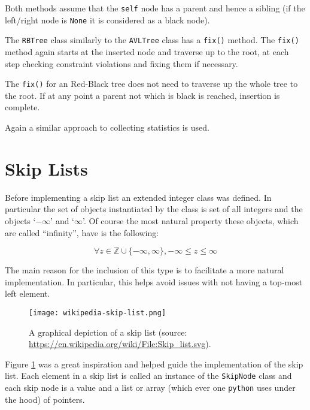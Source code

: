 \documentclass[article]{uom-coursework}
\begin{document}
\begin{note}
Both methods assume that the \texttt{self} node has a parent and
hence a sibling (if the left/right node is \texttt{None} it is
considered as a black node).
\end{note}

The \texttt{RBTree} class similarly to the \texttt{AVLTree}
class has a \texttt{fix()} method. The \texttt{fix()} method
again starts at the inserted node and traverse up to the root,
at each step checking constraint violations and fixing them
if necessary. 

\begin{note}
The \texttt{fix()} for an Red-Black tree does not need to
traverse up the whole tree to the root. If at any point a parent
not which is black is reached, insertion is complete.
\end{note}

Again a similar approach to collecting statistics is used.

\section{Skip Lists}

Before implementing a skip list an extended integer class was
defined. In particular the set of objects instantiated by the
class is set of all integers and the objects `$-\infty$' and
`$\infty$'. Of course the most natural property these objects,
which are called ``infinity'', have is the following:

$$\forall z \in \mathbb{Z} \cup \{-\infty, \infty\}, -\infty \leq z \leq \infty$$

The main reason for the inclusion of this type is to facilitate
a more natural implementation. In particular, this helps avoid
issues with not having a top-most left element.

\begin{figure}[H]
\centering
\texttt{[image: wikipedia-skip-list.png]}
\caption{A graphical depiction of a skip list (source: \url{https://en.wikipedia.org/wiki/File:Skip_list.svg}).}
\label{fig:imageskiplist}
\end{figure}

Figure \ref{fig:imageskiplist} was a great inspiration and
helped guide the implementation of the skip list. Each element
in a skip list is called an instance of the \texttt{SkipNode}
class and each skip node is a value and a list or array (which
ever one \texttt{python} uses under the hood) of pointers.
\end{document}
